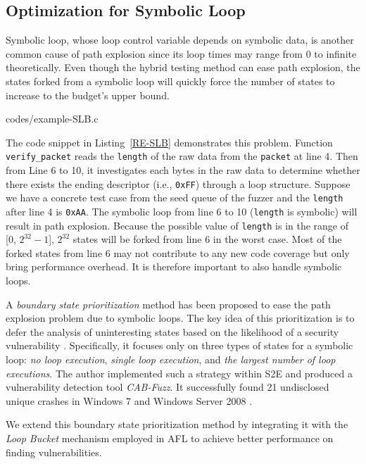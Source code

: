 \subsection{Optimization for Symbolic Loop}
Symbolic loop, whose loop control variable depends on symbolic data, 
is another common cause of path explosion since its loop times may 
range from 0 to infinite theoretically. 
Even though the hybrid testing method can ease path explosion, the 
states forked from a symbolic loop will quickly force the number of 
states to increase to the budget's upper bound. 


{codes/example-SLB.c} 

The code snippet in Listing~\ref{RE-SLB} demonstrates this problem. 
Function \texttt{verify\_packet} reads the \texttt{length} of the 
raw data from the \texttt{packet} at line 4.
 Then from Line 6 to 10, it investigates each bytes in the raw data 
 to determine whether there exists the ending descriptor 
 (i.e., \texttt{0xFF}) through a loop structure. 
 Suppose we have a concrete test case from the seed queue of 
 the fuzzer and the \texttt{length} after line 4 is \texttt{0xAA}. 
 The symbolic loop 
 from line 6 to 10 (\texttt{length} is symbolic) 
 will result in path explosion.
 Because the possible value of \texttt{length} is in the 
 range of [0, $2^{32}-1$], $2^{32}$ states will be forked from 
 line 6 in the worst case. 
Most of the forked states from line 6 may not contribute 
to any new code coverage but only bring performance overhead.
It is therefore important to also handle symbolic loops. 

A \textit{boundary state prioritization} method has been proposed 
to ease the path explosion problem due to symbolic loops.
The key idea of this prioritization is to defer the analysis of 
uninteresting states based on the likelihood of a security vulnerability \cite{cab-fuzz}. 
Specifically, it focuses only on three types of states for a symbolic 
loop: \textit{no loop execution}, \textit{single loop execution}, and 
\textit{the largest number of loop executions}.
The author implemented such a strategy within S2E \cite{chipounov2011s2e} 
and produced a vulnerability detection tool \textit{CAB-Fuzz}.
It successfully found 21 undisclosed unique crashes in Windows 7 and 
Windows Server 2008 \cite{cab-fuzz}.
 
We extend this boundary state prioritization method by integrating it 
with the \emph{Loop Bucket} mechanism employed in AFL \cite{online:afl} 
to achieve better performance on finding vulnerabilities.
 
